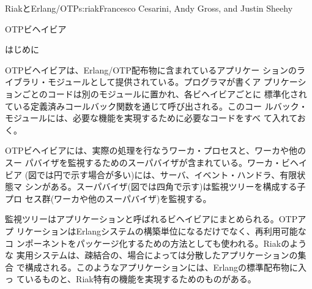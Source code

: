 \begin{aosachapter}{RiakとErlang/OTP}{s:riak}{Francesco Cesarini, Andy Gross, and Justin Sheehy}
\begin{aosasect1}{OTPビヘイビア}
\begin{aosasect2}{はじめに}


OTPビヘイビアは、Erlang/OTP配布物に含まれているアプリケー
ションのライブラリ・モジュールとして提供されている。プログラマが書くア
プリケーションごとのコードは別のモジュールに置かれ、各ビヘイビアごとに
標準化されている定義済みコールバック関数を通じて呼び出される。このコー
ルバック・モジュールには、必要な機能を実現するために必要なコードをすべ
て入れておく。


OTPビヘイビアには、実際の処理を行なうワーカ・プロセスと、ワーカや他のスー
パバイザを監視するためのスーパバイザが含まれている。ワーカ・ビヘイビア
(図では円で示す場合が多い)には、サーバ、イベント・ハンドラ、有限状態マ
シンがある。スーパバイザ(図では四角で示す)は監視ツリーを構成する子プロ
セス群(ワーカや他のスーパバイザ)を監視する。



監視ツリーはアプリケーションと呼ばれるビヘイビアにまとめられる。OTPアプ
リケーションはErlangシステムの構築単位になるだけでなく、再利用可能なコ
ンポーネントをパッケージ化するための方法としても使われる。Riakのような
実用システムは、疎結合の、場合によっては分散したアプリケーションの集合
で構成される。このようなアプリケーションには、Erlangの標準配布物に入っ
ているものと、Riak特有の機能を実現するためのものがある。


\end{aosasect2}
\end{aosasect1}
\end{aosachapter}
